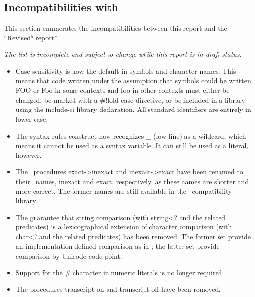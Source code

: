 

\subsection*{Incompatibilities with \rfivers}
\label{incompatibilities}

This section enumerates the incompatibilities between this report and
the ``Revised$^5$ report''~\cite{R5RS}.

{\em The list is incomplete and subject to change while this report is in draft status.}


\begin{itemize}

\item Case sensitivity is now the default in symbols and character names.
This means that code written under the assumption that symbols could be
written {\cf FOO} or {\cf Foo} in some contexts and {\cf foo} in other contexts
must either be changed, be marked with a {\cf \#!fold-case} directive,
or be included in a library using the {\cf include-ci} library declaration.
All standard identifiers are entirely in lower case.

\item The {\cf syntax-rules} construct now recognizes {\em \_} (low line) 
as a wildcard, which means it cannot be used as a syntax variable.
It can still be used as a literal, however.

\item The \rfivers\ procedures {\cf exact->inexact} and {\cf inexact->exact}
have been renamed to their \rsixrs\ names, {\cf inexact} and {\cf exact},
respectively, as these names are shorter and more correct.
The former names are still available in the \rfivers\ compatibility library.

\item The guarantee that string comparison (with {\cf string<?} and the
related predicates) is a lexicographical extension of character comparison
(with {\cf char<?} and the related predicates) has been removed.  The former
set provide an implementation-defined comparison as in \rfivers; the latter
set provide comparison by Unicode code point.

\item Support for the \# character in numeric literals is no longer required.

\item The procedures {\cf transcript-on} and {\cf transcript-off} have been removed.

\end{itemize}


